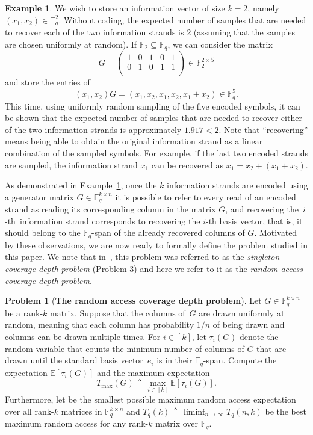 \documentclass[11pt,a4paper,reqno,twoside]{amsart}
\theoremstyle{definition}
\newtheorem{example}{Example}
\newtheorem{prob}{Problem}
\newcommand{\F}{\mathbb{F}}
\newcommand{\E}{\mathbb{E}}
\newcommand{\tmax}{T_{\max}}
\begin{document}
\begin{example}\label{ex:introE}
We wish to store an information vector of size $k=2$, namely $(x_1,x_2) \in \F_q^2$. Without coding, the expected number of samples that are needed to recover each of the two information strands is 2 (assuming 
that the samples are chosen uniformly at random).
If $\F_2 \subseteq \F_q$, we can consider the matrix $$G=\begin{pmatrix} 
    1 & 0 & 1 & 0 & 1  \\
    0 & 1 & 0 & 1 & 1\\
\end{pmatrix} \in \F_2^{2 \times 5} $$ 
and store the entries of
$$(x_1,x_2)G=(x_1,x_2,x_1,x_2,x_1+x_2) \in \F_q^5. $$
This time, using uniformly random sampling of the five encoded symbols, it can be shown that the expected number of samples that are needed to recover either of the two information strands is approximately $1.917<2$. Note that ``recovering'' means being able to obtain the original information strand as a linear combination of the sampled symbols. For example, if the last two encoded strands are sampled, the information strand $x_1$ can be recovered as
$x_1=x_2+(x_1+x_2)$.
\end{example}

As demonstrated in Example~\ref{ex:introE}, once the $k$ information strands are encoded using a generator matrix $G \in \F_q^{k \times n}$ it is possible to refer to every read of an encoded strand as reading its corresponding column in the matrix $G$, and recovering the~{$i$-th}~information strand corresponds to recovering the $i$-th basis vector, that is, it should belong to the $\F_q$-span of the already recovered columns of $G$. Motivated by these observations, we are now ready to formally define the problem studied in this paper. We note that in~\cite{bar2023cover}, this problem was referred to as the \emph{singleton coverage depth problem} (Problem 3) and here we refer to it as the \emph{random access coverage depth problem}.

\begin{prob}[{\textbf{The random access coverage depth problem}}] \label{prob:1}
Let $G \in \F_q^{k \times n}$ be a rank-$k$ matrix. Suppose that the columns of~$G$ are drawn uniformly at random, meaning that each column has probability $1/n$ of being drawn and columns can be drawn multiple times. For $i\in [k]$, let $\tau_i(G)$ denote the random variable that counts the minimum number of columns of $G$ that are drawn until the standard basis vector~$e_i$ is in their $\F_q$-span. Compute the expectation $\E[\tau_i(G)]$ and the maximum expectation $$\tmax(G) \triangleq \max_{i\in[k]}\E[\tau_i(G)].$$ Furthermore, let \smash{$T_q(n,k) \triangleq \min_{G \in \F_q^{k \times n}}{\tmax(G)}$} be the smallest possible maximum random access expectation over all rank-$k$ matrices in $\F_q^{k \times n}$ and $T_q(k) \triangleq \liminf_{n\rightarrow\infty}{T_q(n,k)}$ be the best maximum random access for any rank-$k$ matrix over $\F_q$.
\end{prob}
\end{document}
